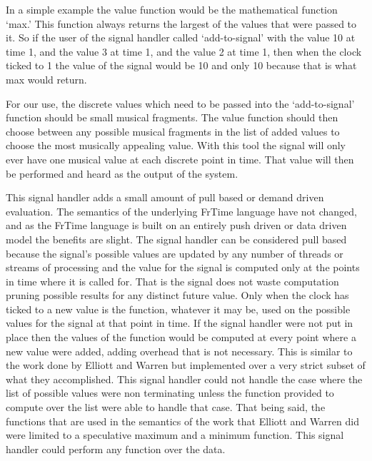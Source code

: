 \documentclass[12pt]{ucthesis}
\begin{document}
{In a simple example the value function would be the mathematical function `max.' This function always returns the largest of the values that were passed to it. So if the user of the signal handler called `add-to-signal' with the value 10 at time 1, and the value 3 at time 1, and the value 2 at time 1, then when the clock ticked to 1 the value of the signal would be 10 and only 10 because that is what max would return. 

For our use, the discrete values which need to be passed into the `add-to-signal' function should be small musical fragments. The value function should then choose between any possible musical fragments in the list of added values to choose the most musically appealing value.  With this tool the signal will only ever have one musical value at each discrete point in time. That value will then be performed and heard as the output of the system. 

This signal handler adds a small amount of pull based or demand driven evaluation. The semantics of the underlying FrTime language have not changed, and as the FrTime language is built on an entirely push driven or data driven model the benefits are slight. The signal handler can be considered pull based because the signal's possible values are updated by any number of threads or streams of processing and the value for the signal is computed only at the points in time where it is called for. That is the signal does not waste computation pruning possible results for any distinct future value. Only when the clock has ticked to a new value is the function, whatever it may be, used on the possible values for the signal at that point in time. If the signal handler were not put in place then the values of the function would be computed at every point where a new value were added, adding overhead that is not necessary. This is similar to the work done by Elliott and Warren but implemented over a very strict subset of what they accomplished. This signal handler could not handle the case where the list of possible values were non terminating unless the function provided to compute over the list were able to handle that case. That being said, the functions that are used in the semantics of the work that Elliott and Warren did were limited to a speculative maximum and a minimum function. This signal handler could perform any function over the data. 


}
\end{document}
